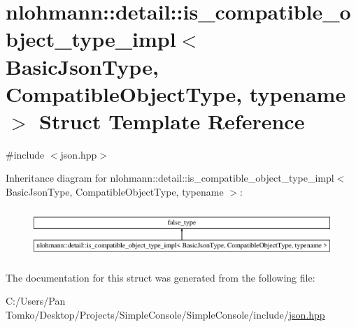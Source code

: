 \hypertarget{structnlohmann_1_1detail_1_1is__compatible__object__type__impl}{}\section{nlohmann\+::detail\+::is\+\_\+compatible\+\_\+object\+\_\+type\+\_\+impl$<$ Basic\+Json\+Type, Compatible\+Object\+Type, typename $>$ Struct Template Reference}
\label{structnlohmann_1_1detail_1_1is__compatible__object__type__impl}


{\ttfamily \#include $<$json.\+hpp$>$}

Inheritance diagram for nlohmann\+::detail\+::is\+\_\+compatible\+\_\+object\+\_\+type\+\_\+impl$<$ Basic\+Json\+Type, Compatible\+Object\+Type, typename $>$\+:\begin{figure}[H]
\begin{center}
\leavevmode
\includegraphics[height=1.860465cm]{dc/da5/structnlohmann_1_1detail_1_1is__compatible__object__type__impl}
\end{center}
\end{figure}


The documentation for this struct was generated from the following file\+:\begin{DoxyCompactItemize}
\item 
C\+:/\+Users/\+Pan Tomko/\+Desktop/\+Projects/\+Simple\+Console/\+Simple\+Console/include/\mbox{\hyperlink{json_8hpp}{json.\+hpp}}\end{DoxyCompactItemize}

